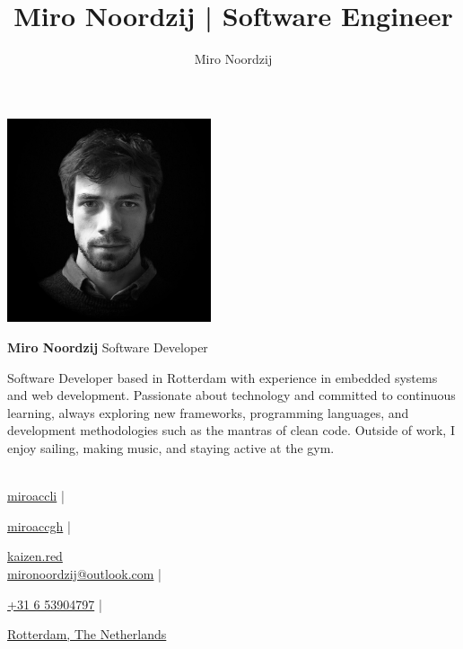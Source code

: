 \documentclass[11pt, twoside, a4paper, titlepage]{article}
\author{Miro Noordzij}
\title{Miro Noordzij | Software Engineer}
\begin{document}
\begin{tcolorbox}[boxsep=0mm, left=0mm, right=0mm, top=0mm, bottom=0mm]
	\begin{minipage}{6cm}
		\includegraphics[width=6cm, height=6cm ]{avatar.jpg}
	\end{minipage}
	\begin{minipage}{14.8cm}
		\begin{center}
			\Huge
			\textbf{Miro Noordzij}  Software Developer
			\vspace*{0.3cm}\\
			\small
			\parbox{14cm}{Software Developer based in Rotterdam with experience in embedded systems and web development. Passionate about technology and committed to continuous learning, always exploring new frameworks, programming languages, and development methodologies such as the mantras of clean code. Outside of work, I enjoy sailing, making music, and staying active at the gym.}
			\vspace*{0.3cm}\\
			
			\href{https://www.linkedin.com/in/miroaccli}{miroaccli} |
			
			\href{https://www.github.com/miroaccgh}{miroaccgh} |
			
			\href{https://www.kaizen.red}{kaizen.red} \\
			
			\href{mailto:mironoordzij@outlook.com}{mironoordzij@outlook.com} |
			
			\href{tel:+31653904797}{+31 6 53904797} |
			
			\href{https://g.co/kgs/Ak21VtP}{Rotterdam, The Netherlands}
		\end{center}
	\end{minipage}
\end{tcolorbox}

\vspace{-0.6cm}
\end{document}
